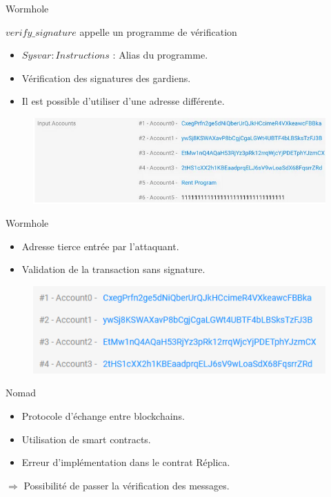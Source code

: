 \begin{frame}{Wormhole}
    \begin{block}{$verify\_signature$ appelle un programme de vérification}
        \begin{itemize}
            \item $Sysvar: Instructions$ : Alias du programme.
            \item Vérification des signatures des gardiens.
            \item Il est possible d'utiliser d'une adresse différente.
        \end{itemize}  
    \end{block}
    \begin{figure}
        \centering
        \includegraphics[scale = 0.3]{img/wormhole_img1.png}
    \end{figure}
\end{frame}

\begin{frame}{Wormhole}
    \begin{itemize}
        \item Adresse tierce entrée par l'attaquant.
        \item Validation de la transaction sans signature.
    \end{itemize}
        \begin{figure}
        \centering
        \includegraphics[scale = 0.7]{img/wormhole_img2.png}
    \end{figure}
\end{frame}



\begin{frame}{Nomad}
    \begin{itemize}
        \item Protocole d'échange entre blockchains.
        \item Utilisation de smart contracts.
        \item Erreur d'implémentation dans le contrat Réplica.
    \end{itemize}
    $\Rightarrow$ Possibilité de passer la vérification des messages.
\end{frame}

